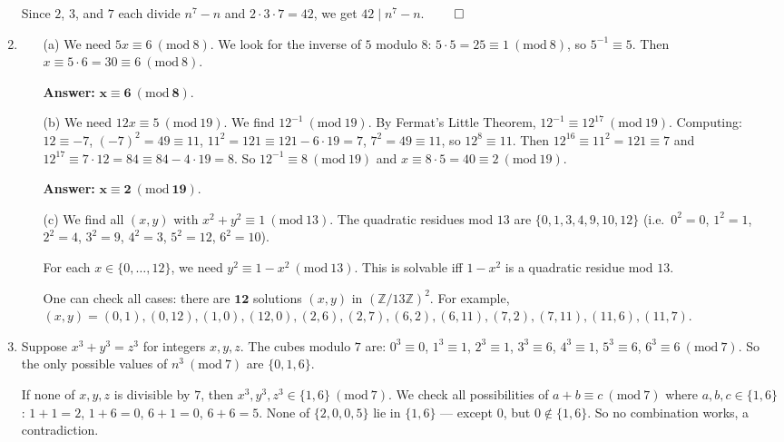 \documentclass[12pt]{article}
\newcommand{\Mod}[1]{\ (\mathrm{mod}\ #1)}
\newcommand{\field}[1]{\mathbb{#1}}
\newcommand{\Z}{\field{Z}}
\begin{document}
\begin{enumerate}
Since $2$, $3$, and $7$ each divide $n^7-n$ and $2\cdot 3\cdot 7=42$, we get $42\mid n^7-n$. $\qed$

\item
\begin{enumerate}
  \item[(a)] We need $5x\equiv 6\Mod{8}$. We look for the inverse of $5$ modulo $8$:
  $5\cdot 5=25\equiv 1\Mod{8}$, so $5^{-1}\equiv 5$.
  Then $x\equiv 5\cdot 6=30\equiv 6\Mod{8}$.

  \textbf{Answer: }$\mathbf{x\equiv 6\Mod{8}}$.

  \item[(b)] We need $12x\equiv 5\Mod{19}$. We find $12^{-1}\Mod{19}$.
  By Fermat's Little Theorem, $12^{-1}\equiv 12^{17}\Mod{19}$.
  Computing: $12\equiv -7$, $(-7)^2=49\equiv 11$, $11^2=121\equiv 121-6\cdot 19=7$, $7^2=49\equiv 11$, so $12^8\equiv 11$.
  Then $12^{16}\equiv 11^2=121\equiv 7$ and $12^{17}\equiv 7\cdot 12=84\equiv 84-4\cdot 19=8$.
  So $12^{-1}\equiv 8\Mod{19}$ and $x\equiv 8\cdot 5=40\equiv 2\Mod{19}$.

  \textbf{Answer: }$\mathbf{x\equiv 2\Mod{19}}$.

  \item[(c)] We find all $(x,y)$ with $x^2+y^2\equiv 1\Mod{13}$.
  The quadratic residues mod $13$ are $\{0,1,3,4,9,10,12\}$ (i.e.\ $0^2=0$, $1^2=1$, $2^2=4$, $3^2=9$, $4^2=3$, $5^2=12$, $6^2=10$).

  For each $x\in\{0,\ldots,12\}$, we need $y^2\equiv 1-x^2\Mod{13}$.
  This is solvable iff $1-x^2$ is a quadratic residue mod $13$.

  One can check all cases: there are $\mathbf{12}$ solutions $(x,y)$ in $(\Z/13\Z)^2$.
  For example, $(x,y)=(0,1),(0,12),(1,0),(12,0),(2,6),(2,7),(6,2),(6,11),(7,2),(7,11),(11,6),(11,7)$.
\end{enumerate}

\item Suppose $x^3+y^3=z^3$ for integers $x,y,z$.
The cubes modulo $7$ are: $0^3\equiv 0$, $1^3\equiv 1$, $2^3\equiv 1$, $3^3\equiv 6$, $4^3\equiv 1$, $5^3\equiv 6$, $6^3\equiv 6\Mod{7}$.
So the only possible values of $n^3\Mod{7}$ are $\{0,1,6\}$.

If none of $x,y,z$ is divisible by $7$, then $x^3,y^3,z^3\in\{1,6\}\Mod{7}$.
We check all possibilities of $a+b\equiv c\Mod{7}$ where $a,b,c\in\{1,6\}$:
$1+1=2$, $1+6=0$, $6+1=0$, $6+6=5$. None of $\{2,0,0,5\}$ lie in $\{1,6\}$ ---
except $0$, but $0\notin\{1,6\}$. So no combination works, a contradiction.


\end{enumerate}
\end{document}
